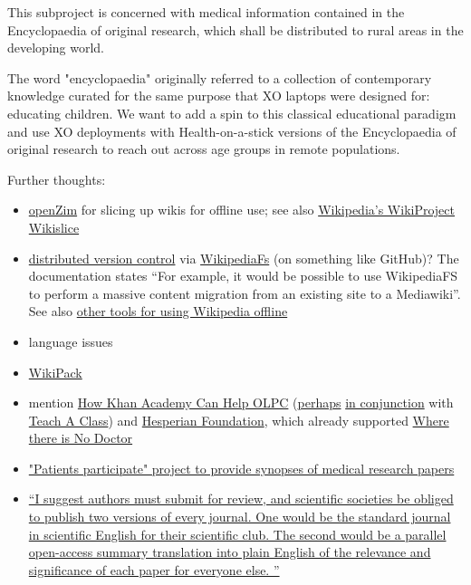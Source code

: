 \documentclass[final,authoryear,3p]{elsarticle-open-drafting}
\begin{document}
This subproject is concerned with medical information contained in the Encyclopaedia of original research, which shall be distributed to rural areas in the developing world. 

The word "encyclopaedia" originally referred to a collection of contemporary knowledge 
curated for the same purpose that XO laptops were designed for: educating children.
We want to add a spin to this classical educational paradigm and use XO deployments with Health-on-a-stick versions 
of the Encyclopaedia of original research to reach out across age groups in remote populations.


Further thoughts:

\begin{itemize}
	\item \href{http://www.openzim.org}{openZim} for slicing up wikis for offline use; see also \href{http://en.wikipedia.org/wiki/Wikipedia:WikiProject_Wikislice}{Wikipedia's WikiProject Wikislice}
	\item \href{http://lists.wikimedia.org/pipermail/foundation-l/2008-February/038623.html}{distributed version control} via \href{http://wikipediafs.sourceforge.net/}{WikipediaFs} (on something like GitHub)? The documentation states ``For example, it would be possible to use WikipediaFS to perform a massive content migration from an existing site to a Mediawiki''. See also \href{http://zikoblog.wordpress.com/2011/05/29/wikipedia-offline-2/}{other tools for using Wikipedia offline}
	\item language issues
	\item \href{http://wiki.laptop.org/go/WikiPack}{WikiPack}
	\item mention \href{http://www.olpcnews.com/content/education/how_khan_academy_can_help_olpc.html}{How Khan Academy Can Help OLPC} (\href{http://seidensj.wordpress.com/2011/06/06/next-steps-with-khan-academy-olpc-translations-sugar-activities-and-etoys-videos/}{perhaps} \href{http://blog.laptop.org/2011/06/06/khan-academy-videos-and-olpc/}{in conjunction} with \href{http://www.teachaclass.org/}{Teach A Class}) and \href{http://www.hesperian.org/publications_download.php}{Hesperian Foundation}, which already supported \href{http://site.ebrary.com/lib/hesperian/docDetail.action?docID=10411911}{Where there is No Doctor}
	\item \href{http://blogs.ukoln.ac.uk/patientsparticipate/}{"Patients participate" project to provide synopses of medical research papers}
	\item \href{http://friendfeed.com/oatp/523cde73/alan-bett-proposal-for-communicating-science}{``I suggest authors must submit for review, and scientific societies be obliged to publish two versions of every journal. One would be the standard journal in scientific English for their scientific club. The second would be a parallel open-access summary translation into plain English of the relevance and significance of each paper for everyone else. ''}
\end{itemize}
\end{document}
